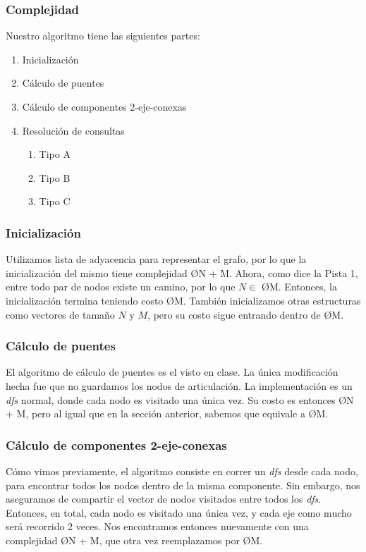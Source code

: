 \subsubsection{Complejidad}
\noindent
Nuestro algoritmo tiene las siguientes partes:
\begin{enumerate}
\item Inicialización
\item Cálculo de puentes
\item Cálculo de componentes 2-eje-conexas
\item Resolución de consultas
\begin{enumerate}
\item Tipo A
\item Tipo B
\item Tipo C
\end{enumerate}
\end{enumerate}

\subsubsection{Inicialización}
\noindent
Utilizamos lista de adyacencia para representar el grafo, por lo que la inicialización del mismo tiene complejidad  \O{N + M}. Ahora, como dice la Pista 1, entre todo par de nodos existe un camino, por lo que $N \in$ \O{M}. Entonces, la inicialización termina teniendo costo \O{M}. También inicializamos otras estructuras como vectores de tamaño $N$ y $M$, pero su costo sigue entrando dentro de \O{M}.

\subsubsection{Cálculo de puentes}
\noindent
El algoritmo de cálculo de puentes es el visto en clase. La única modificación hecha fue que no guardamos los nodos de articulación. La implementación es un \textit{dfs} normal, donde cada nodo es visitado una única vez. Su costo es entonces \O{N + M}, pero al igual que en la sección anterior, sabemos que equivale a \O{M}. 

\subsubsection{Cálculo de componentes 2-eje-conexas}
\noindent
Cómo vimos previamente, el algoritmo consiste en correr un \textit{dfs} desde cada nodo, para encontrar todos los nodos dentro de la misma componente. Sin embargo, nos aseguramos de compartir el vector de nodos visitados entre todos los \textit{dfs}. Entonces, en total, cada nodo es visitado una única vez, y cada eje como mucho será recorrido 2 veces. Nos encontramos entonces nuevamente con una complejidad \O{N + M}, que otra vez reemplazamos por \O{M}.

